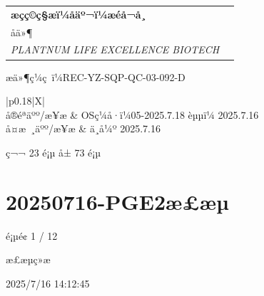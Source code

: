 \documentclass[UTF8,10pt,a4paper,fontset=fandol]{ctexart}
\newcommand{\fieldvalue}[1]{#1}
\newcommand{\handwritten}[1]{#1}
\begin{document}
\newpage

\noindent
\begin{tabularx}{\textwidth}{@{}Xr@{}}
\textbf{æçç©ç§æï¼åäº¬ï¼æéå¬å¸} & \fbox{\begin{tabular}{c}æçç©\\åä»¶\end{tabular}}\\
\textit{PLANTNUM LIFE EXCELLENCE BIOTECH} & \\
\end{tabularx}

\noindent
\hfill æä»¶ç¼ç ï¼REC-YZ-SQP-QC-03-092-D

\vspace{0.2em}

\noindent
\begin{tabularx}{\textwidth}{|p{}|X|}
\hline
{}\\
\hline
å®éªäºº/æ¥æ &
\fieldvalue{\handwritten{OSç¼å·ï¼05-2025.7.18}}
\hspace{2em}
\fieldvalue{\handwritten{èµµï¼ 2025.7.16}}\\
\hline
å¤æ ¸äºº/æ¥æ &
\fieldvalue{\handwritten{ä¸å¼º 2025.7.16}}\\
\hline
\end{tabularx}

\vfill

\begin{center}
ç¬¬ 23 é¡µ å± 73 é¡µ
\end{center}

\newpage

\section*{20250716-PGE2æ£æµ}
\hfill é¡µé¢ 1 / 12

\noindent
æ£æµç»æ

\fieldvalue{2025/7/16 14:12:45}
\end{document}
